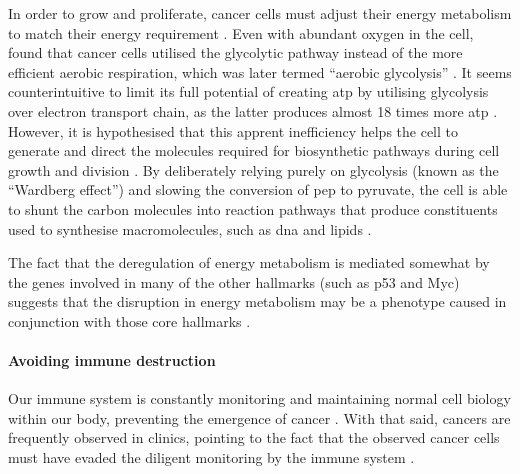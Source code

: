 \noindent
In order to grow and proliferate, cancer cells must adjust their energy metabolism to match their energy requirement \citet{Hanahan2011}.
Even with abundant oxygen in the cell, \citet{Wardburg1956} found that cancer cells utilised the glycolytic pathway instead of the more efficient aerobic respiration, which was later termed ``aerobic glycolysis'' \citep{Hanahan2011}.
It seems counterintuitive to limit its full potential of creating \gls{atp} by utilising glycolysis over electron transport chain, as the latter produces almost 18 times more \gls{atp} \citep{Hanahan2011, VanderHeiden2009}.
However, it is hypothesised  that this apprent inefficiency helps the cell to generate and direct the molecules required for biosynthetic pathways during cell growth and division \citep{Cairns2011,VanderHeiden2009}.
By deliberately relying purely on glycolysis (known as the ``Wardberg effect'') and slowing the conversion of \gls{pep} to pyruvate, the cell is able to shunt the carbon molecules into reaction pathways that produce constituents used to synthesise macromolecules, such as \acrshort{dna} and lipids \citep{Cairns2011,VanderHeiden2009}.

The fact that the deregulation of energy metabolism is mediated somewhat by the genes involved in many of the other hallmarks (such as p53 and Myc) suggests that the disruption in energy metabolism may be a phenotype caused in conjunction with those core hallmarks \citep{Hanahan2011}.

\paragraph{Avoiding immune destruction}

\noindent
Our immune system is constantly monitoring and maintaining normal cell biology within our body, preventing the emergence of cancer \citep{Hanahan2011}.
With that said, cancers are frequently observed in clinics, pointing to the fact that the observed cancer cells must have evaded the diligent monitoring by the immune system \citep{Hanahan2011}.

